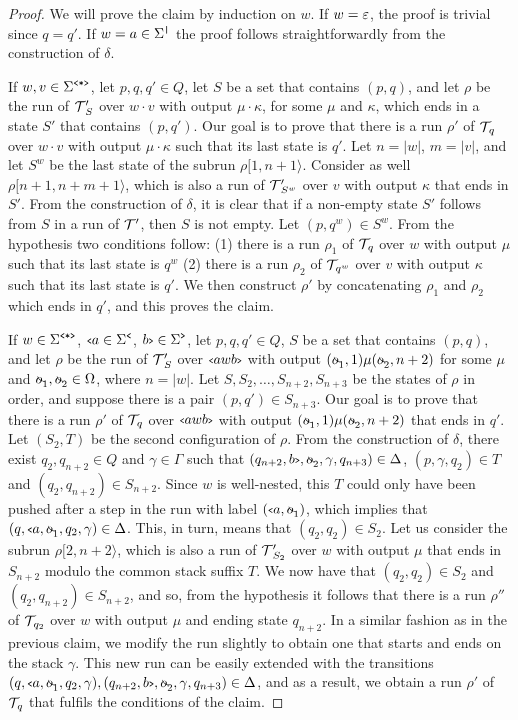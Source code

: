 	\begin{proof}
		We will prove the claim by induction on $w$.
		If $w = \varepsilon$, the proof is trivial since $q = q'$. If $w = a\in\Sigma^{\texttt{|}}$ the proof follows straightforwardly from the construction of $\delta$.
		
		If $w,v\in\Sigma^{\texttt{<*>}}$, let $p,q,q'\in Q$, let $S$ be a set that contains $(p,q)$, and let $\rho$ be the run of $\mathcal{T}\!\,'_S$ over $w\cdot v$ with output $\mu\cdot \kappa$, for some $\mu$ and $\kappa$, which ends in a state $S'$ that contains $(p,q')$. 
		Our goal is to prove that there is a run $\rho'$ of $\mathcal{T}\!_q$ over $w\cdot v$ with output $\mu\cdot\kappa$ such that its last state is $q'$.
		Let $n = \vert w\vert$, $m = \vert v \vert$, and let $S^w$ be the last state of the subrun $\rho[1,n+1\rangle$. 
		Consider as well $\rho[n+1,n+m+1\rangle$, which is also a run of $\mathcal{T}\!\,'_{S^w}$ over $v$ with output $\kappa$ that ends in $S'$.
		From the construction of $\delta$, it is clear that if a non-empty state $S'$ follows from $S$ in a run of $\mathcal{T}\!\,'$, then $S$ is not empty.
		Let $(p,q^w)\in S^w$.
		From the hypothesis two conditions follow: 
		(1) there is a run $\rho_1$ of $\mathcal{T}\!_q$ over $w$ with output $\mu$ such that its last state is $q^w$
		(2) there is a run $\rho_2$ of $\mathcal{T}\!_{q^w}$ over $v$ with output $\kappa$ such that its last state is $q'$. 
		We then construct $\rho'$ by concatenating $\rho_1$ and $\rho_2$ which ends in $q'$, and this proves the claim.
		
		If $w\in\Sigma^{\texttt{<*>}}$, ${\scriptsize\texttt{<}} a\in\Sigma^{\texttt{<}}$, $b{\scriptsize\texttt{>}}\in\Sigma^{\texttt{>}}$, let $p,q,q'\in Q$, $S$ be a set that contains $(p,q)$, and let $\rho$ be the run of $\mathcal{T}\!\,'_S$ over ${\scriptsize\texttt{<}} awb{\scriptsize\texttt{>}}$ with output $(\oout_1, 1)\mu(\oout_2, n+2)$ for some $\mu$ and $\oout_1,\oout_2\in\oalph$, where $n = |w|$. 
		Let $S, S_2, \ldots, S_{n+2}, S_{n+3}$ be the states of $\rho$ in order, and suppose there is a pair $(p,q')\in S_{n+3}$.
		Our goal is to prove that there is a run $\rho'$ of $\mathcal{T}\!_q$ over ${\scriptsize\texttt{<}} awb{\scriptsize\texttt{>}}$ with output $(\oout_1, 1)\mu(\oout_2, n+2)$ that ends in $q'$. 
		Let $(S_2,T)$ be the second configuration of $\rho$.
		From the construction of $\delta$, there exist $q_2,q_{n+2}\in Q$ and $\gamma\in\Gamma$ such that $(q_{n+2},\cl{b},\oout_2,\gamma,q_{n+3})\in\Delta$, $(p,\gamma,q_2)\in T$ and $(q_2,q_{n+2})\in S_{n+2}$.
		Since $w$ is well-nested, this $T$ could only have been pushed after a step in the run with label $(\op{a},\oout_1)$, which implies that $(q,\op{a},\oout_1,q_2,\gamma)\in\Delta$. This, in turn, means that $(q_2,q_2)\in S_2$.
		Let us consider the subrun $\rho[2,n+2\rangle$, which is also a run of $\mathcal{T}\!\,'_{S_2}$ over $w$ with output $\mu$ that ends in $S_{n+2}$ modulo the common stack suffix $T$.
		We now have that $(q_2,q_2)\in S_2$ and $(q_2,q_{n+2})\in S_{n+2}$, and so, from the hypothesis it follows that there is a run $\rho''$ of $\mathcal{T}\!_{q_2}$ over $w$ with output $\mu$ and ending state $q_{n+2}$.
		In a similar fashion as in the previous claim, we modify the run slightly to obtain one that starts and ends on the stack $\gamma$.
		This new run can be easily extended with the transitions $(q,\op{a},\oout_1,q_2,\gamma),(q_{n+2},\cl{b},\oout_2,\gamma,q_{n+3})\in\Delta$, and as a result, we obtain a run $\rho'$ of $\mathcal{T}\!_q$ that fulfils the conditions of the claim.
	\end{proof}
